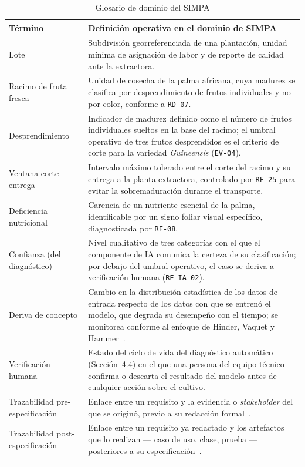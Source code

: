 \documentclass[11pt,a4paper]{article}
\newcommand{\id}[1]{\texttt{#1}}
\begin{document}
\begin{longtable}{|L{3.4cm}|L{9.4cm}|}
\hline
{}\textbf{Término} & \textbf{Definición operativa en el dominio de SIMPA} \\
\hline
\endhead
Lote & Subdivisión georreferenciada de una plantación, unidad mínima de asignación de labor y de
reporte de calidad ante la extractora. \\ \hline
Racimo de fruta fresca & Unidad de cosecha de la palma africana, cuya madurez se clasifica por
desprendimiento de frutos individuales y no por color, conforme a \id{RD-07}. \\ \hline
Desprendimiento & Indicador de madurez definido como el número de frutos individuales sueltos en la
base del racimo; el umbral operativo de tres frutos desprendidos es el criterio de corte para la
variedad \emph{Guineensis} (\id{EV-04}). \\ \hline
Ventana corte-entrega & Intervalo máximo tolerado entre el corte del racimo y su entrega a la
planta extractora, controlado por \id{RF-25} para evitar la sobremaduración durante el transporte.
\\ \hline
Deficiencia nutricional & Carencia de un nutriente esencial de la palma, identificable por un signo
foliar visual específico, diagnosticada por \id{RF-08}. \\ \hline
Confianza (del diagnóstico) & Nivel cualitativo de tres categorías con el que el componente de IA
comunica la certeza de su clasificación; por debajo del umbral operativo, el caso se deriva a
verificación humana (\id{RF-IA-02}). \\ \hline
Deriva de concepto & Cambio en la distribución estadística de los datos de entrada respecto de los
datos con que se entrenó el modelo, que degrada su desempeño con el tiempo; se monitorea conforme
al enfoque de Hinder, Vaquet y Hammer~\cite{hinder2024}. \\ \hline
Verificación humana & Estado del ciclo de vida del diagnóstico automático (Sección~4.4) en el que
una persona del equipo técnico confirma o descarta el resultado del modelo antes de cualquier
acción sobre el cultivo. \\ \hline
Trazabilidad pre-especificación & Enlace entre un requisito y la evidencia o \emph{stakeholder} del
que se originó, previo a su redacción formal~\cite{mucha2024}. \\ \hline
Trazabilidad post-especificación & Enlace entre un requisito ya redactado y los artefactos que lo
realizan --- caso de uso, clase, prueba --- posteriores a su especificación~\cite{mucha2024}. \\
\hline
\caption{Glosario de dominio del SIMPA}
\end{longtable}
\end{document}
